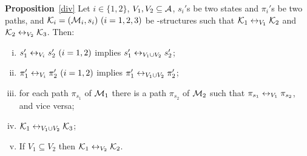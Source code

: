 \documentclass[letterpaper]{article} %
\begin{document}
\noindent\textbf{Proposition}~\ref{div}
Let $i\in \{1,2\}$, $V_1,V_2\subseteq\cal A$, $s_i'$s be two states and
  $\pi_i'$s be two paths,
and ${\cal K}_i=({\cal M}_i,s_i)~(i=1,2,3)$ be \MPK-structures
 such that
${\cal K}_1\leftrightarrow_{V_1}{\cal K}_2$ and ${\cal K}_2\leftrightarrow_{V_2}{\cal K}_3$.
 Then:
 \begin{enumerate}[(i)]
   \item $s_1'\leftrightarrow_{V_i}s_2'~(i=1,2)$ implies $s_1'\leftrightarrow_{V_1\cup V_2}s_2'$;
   \item $\pi_1'\leftrightarrow_{V_i}\pi_2'~(i=1,2)$ implies $\pi_1'\leftrightarrow_{V_1\cup V_2}\pi_2'$;
   \item for each path $\pi_{s_1}$ of ${\cal M}_1$ there is a path $\pi_{s_2}$  of ${\cal M}_2$ such that $\pi_{s_1} \leftrightarrow_{V_1} \pi_{s_2}$, and vice versa;
   \item ${\cal K}_1\leftrightarrow_{V_1\cup V_2}{\cal K}_3$;
   \item If $V_1 \subseteq V_2$ then ${\cal K}_1 \leftrightarrow_{V_2} {\cal K}_2$.
 \end{enumerate}
\end{document}

